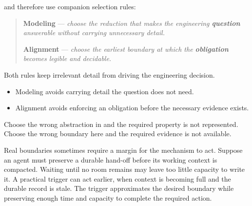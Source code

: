 
 and  therefore use companion selection rules:


\begin{quote}
\textbf{Modeling} --- \emph{choose the reduction that makes the engineering \textbf{question} answerable without carrying unnecessary detail.}

\textbf{Alignment} --- \emph{choose the earliest boundary at which the \textbf{obligation} becomes legible and decidable.}
\end{quote}

Both rules keep irrelevant detail from driving the engineering decision.

\begin{itemize}
\tightlist
\item
  Modeling avoids carrying detail the question does not need.
\item
  Alignment avoids enforcing an obligation before the necessary evidence exists.
\end{itemize}

Choose the wrong abstraction in  and the required property is not represented. Choose the wrong boundary here and the required evidence is not available.


Real boundaries sometimes require a margin for the mechanism to act. Suppose an agent must preserve a durable hand-off before its working context is compacted. Waiting until no room remains may leave too little capacity to write it. A practical trigger can act earlier, when context is becoming full and the durable record is stale. The trigger approximates the desired boundary while preserving enough time and capacity to complete the required action.

